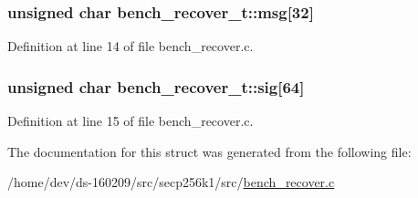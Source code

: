 \subsubsection[{msg}]{\setlength{\rightskip}{0pt plus 5cm}unsigned char bench\+\_\+recover\+\_\+t\+::msg\mbox{[}32\mbox{]}}\label{structbench__recover__t_ae1fb7111eb50d3b09ea073ffa61824ee}


Definition at line 14 of file bench\+\_\+recover.\+c.

\hypertarget{structbench__recover__t_a76d1266b30c8d6a55fd52e9bb7c67a85}{}
\subsubsection[{sig}]{\setlength{\rightskip}{0pt plus 5cm}unsigned char bench\+\_\+recover\+\_\+t\+::sig\mbox{[}64\mbox{]}}\label{structbench__recover__t_a76d1266b30c8d6a55fd52e9bb7c67a85}


Definition at line 15 of file bench\+\_\+recover.\+c.



The documentation for this struct was generated from the following file\+:\begin{DoxyCompactItemize}
\item 
/home/dev/ds-\/160209/src/secp256k1/src/\hyperlink{bench__recover_8c}{bench\+\_\+recover.\+c}\end{DoxyCompactItemize}
